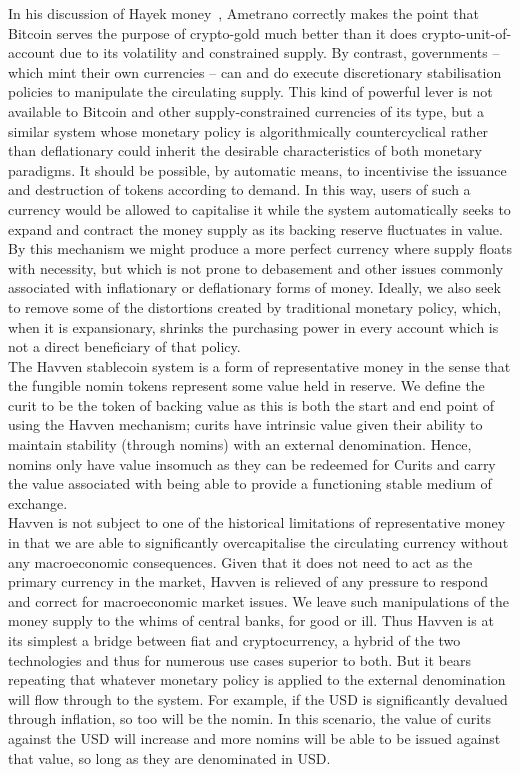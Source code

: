 \noindent  In his discussion of Hayek money~\cite{ametrano2016hayek}, Ametrano correctly makes the point that
Bitcoin serves the purpose of crypto-gold much better than it does crypto-unit-of-account due to its volatility
and constrained supply. By contrast, governments -- which mint their own currencies -- can and do execute
discretionary stabilisation policies to manipulate the circulating supply. This kind of powerful lever is not
available to Bitcoin and other supply-constrained currencies of its type, but a similar system whose monetary
policy is algorithmically countercyclical rather than deflationary could inherit the desirable characteristics
of both monetary paradigms. It should be possible, by automatic means, to incentivise the issuance and
destruction of tokens according to demand. In this way, users of such a currency would be allowed to
capitalise it while the system automatically seeks to expand and contract the money supply as its backing
reserve fluctuates in value. By this mechanism we might produce a more perfect currency where supply floats
with necessity, but which is not prone to debasement and other issues commonly associated with
inflationary or deflationary forms of money. Ideally, we also seek to remove some of the distortions created
by traditional monetary policy, which, when it is expansionary, shrinks the purchasing power in every account
which is not a direct beneficiary of that policy.\\

\noindent The Havven stablecoin system is a form of representative money in the sense that the fungible nomin
tokens represent some value held in reserve. We define the curit to be the token of backing value as this is
both the start and end point of using the Havven mechanism; curits have intrinsic value given their ability
to maintain stability (through nomins) with an external denomination. Hence, nomins only have value insomuch as they can be redeemed for Curits and carry the value associated with being able to provide a functioning stable medium of exchange. \\

\noindent Havven is not subject to one of the historical limitations of representative money in that we are able to significantly overcapitalise the circulating currency without any macroeconomic consequences. Given that it does not need to act as the primary currency in the market, Havven is relieved of any pressure to respond and correct for macroeconomic market issues. We leave such manipulations of the money
supply to the whims of central banks, for good or ill. Thus Havven is at its simplest a bridge between fiat and
cryptocurrency, a hybrid of the two technologies and thus for numerous use cases superior to both. But it bears
repeating that whatever monetary policy is applied to the external denomination will flow through to the system.
For example, if the USD is significantly devalued through inflation, so too will be the nomin. In this scenario,
the value of curits against the USD will increase and more nomins will be able to be issued against that value,
so long as they are denominated in USD. \\

